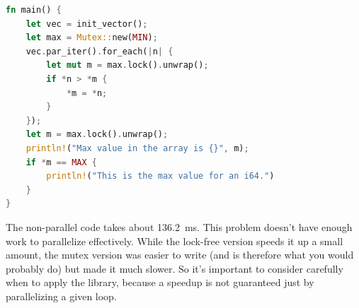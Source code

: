 \documentclass[a4paper]{report}
\begin{document}
\begin{appendices}
\begin{lstlisting}[language=Rust]
fn main() {
    let vec = init_vector();
    let max = Mutex::new(MIN);
    vec.par_iter().for_each(|n| {
        let mut m = max.lock().unwrap();
        if *n > *m {
            *m = *n;
        }
    });
    let m = max.lock().unwrap();
    println!("Max value in the array is {}", m);
    if *m == MAX {
        println!("This is the max value for an i64.")
    }
}
\end{lstlisting}

 The non-parallel code takes about 136.2~ms. This problem doesn't have enough work to parallelize effectively. While the lock-free version speeds it up a small amount, the mutex version was easier to write (and is therefore what you would probably do) but made it much slower. So it's important to consider carefully when to apply the library, because a speedup is not guaranteed just by parallelizing a given loop.




\end{appendices}
\end{document}
